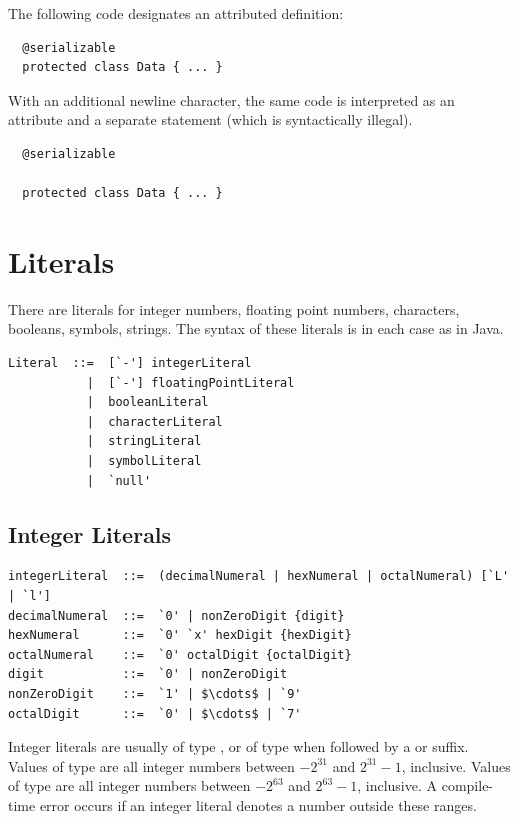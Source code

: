 \example The following code designates an attributed definition:

\begin{lstlisting}
  @serializable
  protected class Data { ... }
\end{lstlisting}

With an additional newline character, the same code is interpreted as
an attribute and a separate statement (which is syntactically
illegal).

\begin{lstlisting}
  @serializable

  protected class Data { ... }
\end{lstlisting}


\section{Literals}\label{sec:literals}

There are literals for integer numbers, floating point numbers,
characters, booleans, symbols, strings.  The syntax of these literals is in
each case as in Java.


\syntax\begin{lstlisting}
Literal  ::=  [`-'] integerLiteral
           |  [`-'] floatingPointLiteral
           |  booleanLiteral
           |  characterLiteral
           |  stringLiteral
           |  symbolLiteral
           |  `null'
\end{lstlisting}

\subsection{Integer Literals}

\syntax\begin{lstlisting}
integerLiteral  ::=  (decimalNumeral | hexNumeral | octalNumeral) [`L' | `l']
decimalNumeral  ::=  `0' | nonZeroDigit {digit}
hexNumeral      ::=  `0' `x' hexDigit {hexDigit}
octalNumeral    ::=  `0' octalDigit {octalDigit}
digit           ::=  `0' | nonZeroDigit
nonZeroDigit    ::=  `1' | $\cdots$ | `9'
octalDigit      ::=  `0' | $\cdots$ | `7'
\end{lstlisting}
Integer literals are usually of type \lstinline@Int@, or of type
\lstinline@Long@ when followed by a \lstinline@L@ or
\lstinline@l@ suffix. Values of type \lstinline@Int@ are all integer
numbers between $-2^{31}$ and $2^{31}-1$, inclusive.  Values of
type \lstinline@Long@ are all integer numbers between $-2^{63}$ and
$2^{63}-1$, inclusive. A compile-time error occurs if an integer literal
denotes a number outside these ranges.

